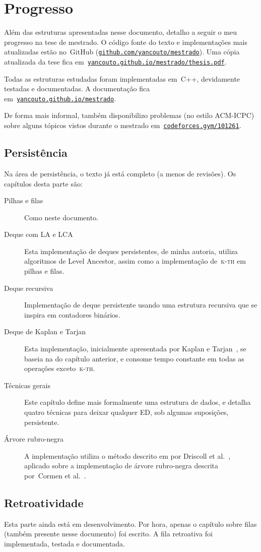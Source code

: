 \documentclass[quali.tex]{subfile}
\begin{document}
\section{Progresso}

Além das estruturas apresentadas nesse documento, detalho a seguir o meu progresso na tese de mestrado. O código fonte do texto e implementações mais atualizadas estão no~GitHub (\href{https://github.com/yancouto/mestrado}{\texttt{github.com/yancouto/mestrado}}). Uma cópia atualizada da tese fica em\mbox{~\href{https://yancouto.github.io/mestrado/thesis.pdf}{\texttt{yancouto.github.io/mestrado/thesis.pdf}}}.

Todas as estruturas estudadas foram implementadas em~C++, devidamente testadas e documentadas. A documentação fica em~\mbox{\href{https://yancouto.github.io/mestrado/}{\texttt{yancouto.github.io/mestrado}}}.

De forma mais informal, também disponibilizo problemas (no estilo ACM-ICPC) sobre alguns tópicos vistos durante o mestrado em~\mbox{\href{http://codeforces.com/gym/101261}{\texttt{codeforces.gym/101261}}}.

\subsection{Persistência}

Na área de persistência, o texto já está completo (a menos de revisões). Os capítulos desta parte são:

\begin{description}
	\item[Pilhas e filas] Como neste documento.
	\item[Deque com LA e LCA] Esta implementação de deques persistentes, de minha autoria, utiliza algoritmos de Level Ancestor, assim como a implementação de~\textsc{k-th} em pilhas e filas.
	\item[Deque recursiva] Implementação de deque persistente usando uma estrutura recursiva que se inspira em contadores binários.
	\item[Deque de Kaplan e Tarjan] Esta implementação, inicialmente apresentada por Kaplan e Tarjan~\cite{KaplanT1999}, se baseia na do capítulo anterior, e consome tempo constante em todas as operações exceto~\textsc{k-th}.
	\item[Técnicas gerais] Este capítulo define mais formalmente uma estrutura de dados, e detalha quatro técnicas para deixar qualquer ED, sob algumas suposições, persistente.
	\item[Árvore rubro-negra] A implementação utiliza o método descrito em por Driscoll et al.~\cite{DriscollSST1989}, aplicado sobre a implementação de árvore rubro-negra descrita por~Cormen et al.~\cite{CormenRedBlack}.
\end{description}

\subsection{Retroatividade}

Esta parte ainda está em desenvolvimento. Por hora, apenas o capítulo sobre filas (também presente nesse documento) foi escrito. A fila retroativa foi implementada, testada e documentada.
\end{document}
